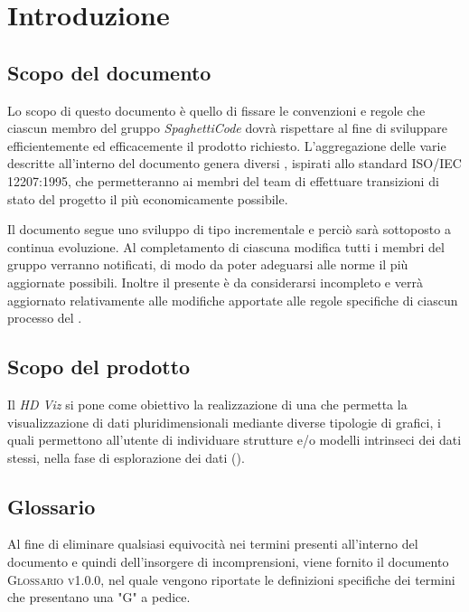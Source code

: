 \section{Introduzione}
\label{sec:introduzione}

\subsection{Scopo del documento}
Lo scopo di questo documento è quello di fissare le convenzioni e regole che ciascun membro del gruppo 
\emph{SpaghettiCode} dovrà rispettare al fine di sviluppare efficientemente ed efficacemente il prodotto richiesto. %
L'aggregazione delle varie  descritte all'interno del documento genera diversi 
, ispirati allo standard \textsc{ISO/IEC 12207:1995}, che permetteranno ai membri del team di effettuare transizioni di stato del progetto il più economicamente possibile. 

Il documento segue uno sviluppo di tipo incrementale e perciò sarà sottoposto a continua evoluzione. Al completamento di 
ciascuna modifica tutti i membri del gruppo verranno notificati, di modo da poter adeguarsi alle norme il più aggiornate 
possibili.
Inoltre il presente è da considerarsi incompleto e verrà aggiornato relativamente alle modifiche apportate alle regole 
specifiche di ciascun processo del .

\subsection{Scopo del prodotto}
Il  \emph{HD Viz} si pone come obiettivo la realizzazione di una  che 
permetta la visualizzazione di dati pluridimensionali mediante diverse tipologie di grafici, i quali permettono 
all'utente di individuare strutture e/o modelli intrinseci dei dati stessi, nella fase di esplorazione dei dati 
().

\subsection{Glossario}
Al fine di eliminare qualsiasi equivocità nei termini presenti all'interno del documento e quindi dell'insorgere di 
incomprensioni, viene fornito il documento \textsc{Glossario v1.0.0}, nel quale vengono riportate le definizioni 
specifiche dei termini che presentano una "G" a pedice.

